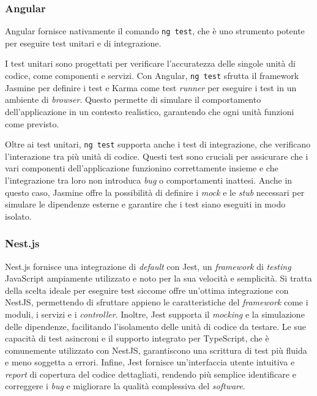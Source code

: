 \subsubsection{Angular}
Angular fornisce nativamente il comando \texttt{ng test}, che è uno strumento
potente per eseguire test unitari e di integrazione.

I test unitari sono progettati per verificare l'accuratezza delle singole
unità di codice, come componenti e servizi. Con Angular, \texttt{ng test}
sfrutta il framework Jasmine per definire i test e Karma come test \textit{runner} per
eseguire i test in un ambiente di \textit{browser}. Questo permette di simulare il
comportamento dell'applicazione in un contesto realistico, garantendo che ogni
unità funzioni come previsto.

Oltre ai test unitari, \texttt{ng test} supporta anche i test di integrazione,
che verificano l'interazione tra più unità di codice. Questi test sono cruciali
per assicurare che i vari componenti dell'applicazione funzionino
correttamente insieme e che l'integrazione tra loro non introduca \textit{bug} o
comportamenti inattesi. Anche in questo caso, Jasmine offre la possibilità di
definire i \textit{mock} e le \textit{stub} necessari per simulare le dipendenze
esterne e garantire che i test siano eseguiti in modo isolato.


\subsubsection{Nest.js}
Nest.js fornisce una integrazione di \textit{default} con Jest, un \textit{framework} di \textit{testing} JavaScript ampiamente utilizzato e noto per la sua velocità e semplicità.
Si tratta della scelta ideale per eseguire test siccome offre un'ottima integrazione con NestJS, permettendo di sfruttare appieno le caratteristiche del \textit{framework} come i moduli, i servizi e i \textit{controller}.
Inoltre, Jest supporta il \textit{mocking} e la simulazione delle dipendenze, facilitando l'isolamento delle unità di codice da testare.
Le sue capacità di test asincroni e il supporto integrato per TypeScript, che è comunemente utilizzato con NestJS, garantiscono una scrittura di test più fluida e meno soggetta a errori.
Infine, Jest fornisce un'interfaccia utente intuitiva e \textit{report} di copertura del codice dettagliati, rendendo più semplice identificare e correggere i \textit{bug} e migliorare la qualità complessiva del \textit{software}.


